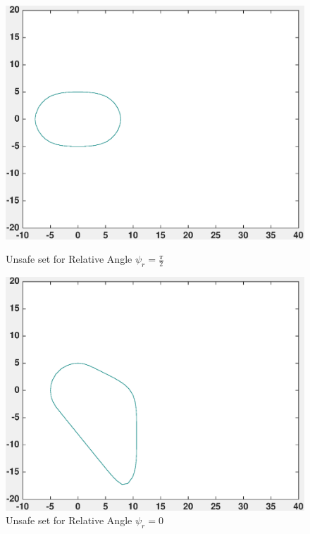 \documentclass[a4paper]{article}
\begin{document}
\begin{figure}[!ht]
  \centering
  \begin{minipage}[b]{0.4\textwidth}
    \includegraphics[width=1.0\textwidth]{velCont_psi1.eps}
    \caption{Unsafe set for Relative Angle $\psi_r = \frac{\pi}{2}$}
  \end{minipage}
  \hfill
  \begin{minipage}[b]{0.4\textwidth}
    \includegraphics[width=1.0\textwidth]{velCont_psi13.eps}
    \caption{Unsafe set for Relative Angle $\psi_r = 0$}
  \end{minipage}
\end{figure}
\end{document}
